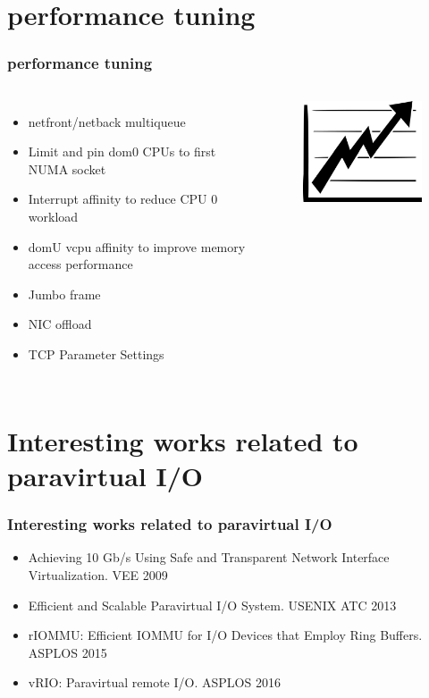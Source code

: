 \documentclass[aspectratio=169]{beamer}
\begin{document}
\section{performance tuning}
\begin{frame}
\frametitle{performance tuning}
\begin{columns}[c]
\begin{itemize}
\item netfront/netback multiqueue
\item Limit and pin dom0 CPUs to first NUMA socket
\item Interrupt affinity to reduce CPU 0 workload
\item domU vcpu affinity to improve memory access performance
\item Jumbo frame
\item NIC offload
\item TCP Parameter Settings
\end{itemize}
\begin{center}
\begin{figure}
\includegraphics[width=.8\linewidth]{figures/performance.pdf}
\end{figure}
\end{center}
\end{columns}
\end{frame}


\section{Interesting works related to paravirtual I/O}
\begin{frame}
\frametitle{Interesting works related to paravirtual I/O}
\begin{itemize}
\item Achieving 10 Gb/s Using Safe and Transparent Network Interface Virtualization. VEE 2009
\item Efficient and Scalable Paravirtual I/O System. USENIX ATC 2013
\item rIOMMU: Efficient IOMMU for I/O Devices that Employ Ring Buffers. ASPLOS 2015
\item vRIO: Paravirtual remote I/O.  ASPLOS 2016
\end{itemize}
\end{frame}
\end{document}
